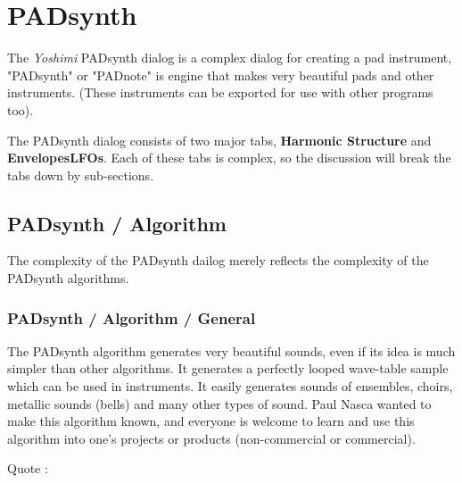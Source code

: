 %
%
%

\section{PADsynth}
\label{sec:padsynth}

   The \textsl{Yoshimi} PADsynth dialog is a complex dialog for creating a
   pad instrument,  "PADsynth" or "PADnote" is engine that makes very
   beautiful pads and other instruments. (These instruments can be exported
   for use with other programs too).

   The PADsynth dialog consists of two major tabs,
   \textbf{Harmonic Structure} and \textbf{EnvelopesLFOs}.
   Each of these tabs is complex, so the discussion
   will break the tabs down by sub-sections.

\subsection{PADsynth / Algorithm}
\label{subsec:padsynth_algorithm}

   The complexity of the PADsynth dailog merely reflects the complexity of the
   PADsynth algorithms.

\subsubsection{PADsynth / Algorithm / General}
\label{subsubsec:padsynth_algorithm_general}

   The PADsynth algorithm generates very beautiful sounds, even if its idea is
   much simpler than other algorithms. It generates a perfectly looped
   wave-table sample which can be used in instruments. It easily generates
   sounds of ensembles, choirs, metallic sounds (bells) and many other types of
   sound.  Paul Nasca wanted to make this algorithm known, and everyone is
   welcome to learn and use this algorithm into one's projects or products
   (non-commercial or commercial).
   
   Quote \cite{zyndoc}:

